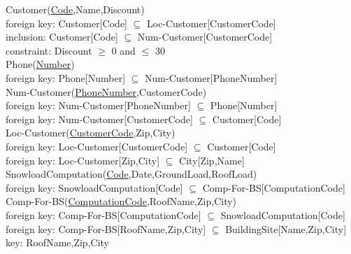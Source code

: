 \documentclass{article}[h]
\begin{document}
{{\color{ForestGreen}Customer(\underline{Code},Name,Discount)}\\
{\color{Orange}\hspace{2mm} foreign key: {\color{Magenta}Customer[Code] $\subseteq$ Loc-Customer[CustomerCode]}} \\
{\color{Orange}\hspace{2mm} inclusion: {\color{Magenta}Customer[Code] $\subseteq$ Num-Customer[CustomerCode]} \\
{\color{Orange}\hspace{2mm} constraint: {\color{Magenta}Discount $\geqslant$  0 and $\leqslant$ 30}} \\ 

{\color{ForestGreen}Phone(\underline{Number})}\\
{\color{Orange}\hspace{2mm} foreign key: {\color{Magenta}Phone[Number] $\subseteq$ Num-Customer[PhoneNumber]}} \\

{\color{ForestGreen}Num-Customer(\underline{PhoneNumber},CustomerCode)}}\\
{\color{Orange}\hspace{2mm} foreign key: {\color{Magenta}Num-Customer[PhoneNumber] $\subseteq$ Phone[Number]}} \\
{\color{Orange}\hspace{2mm} foreign key: {\color{Magenta}Num-Customer[CustomerCode] $\subseteq$ Customer[Code]}} \\

{\color{ForestGreen}Loc-Customer(\underline{CustomerCode},Zip,City)}\\
{\color{Orange}\hspace{2mm} foreign key: {\color{Magenta}Loc-Customer[CustomerCode] $\subseteq$ Customer[Code]}} \\
{\color{Orange}\hspace{2mm} foreign key: {\color{Magenta}Loc-Customer[Zip,City] $\subseteq$ City[Zip,Name]}} \\

{\color{ForestGreen}SnowloadComputation(\underline{Code},Date,GroundLoad,RoofLoad)}\\
{\color{Orange}\hspace{2mm} foreign key: {\color{Magenta}SnowloadComputation[Code] $\subseteq$ Comp-For-BS[ComputationCode]}} \\

{\color{ForestGreen}Comp-For-BS(\underline{ComputationCode},RoofName,Zip,City)}\\
{\color{Orange}\hspace{2mm} foreign key: {\color{Magenta}Comp-For-BS[ComputationCode] $\subseteq$ SnowloadComputation[Code]}} \\
{\color{Orange}\hspace{2mm} foreign key: {\color{Magenta}Comp-For-BS[RoofName,Zip,City] $\subseteq$ BuildingSite[Name,Zip,City]}} \\
{\color{Orange}\hspace{2mm} key: {\color{Magenta}RoofName,Zip,City}} \\

}
\end{document}
